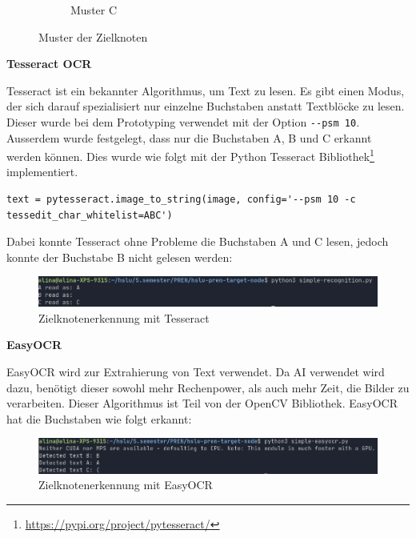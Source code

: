 \begin{figure}[H]
\begin{subfigure}{0.33\textwidth}
\caption{Muster C}
\label{fig:image-c}
\end{subfigure}

\caption{Muster der Zielknoten}
\label{fig:muster-zielknoten}
\end{figure}


\textbf{Tesseract OCR}

Tesseract ist ein bekannter Algorithmus, um Text zu lesen. Es gibt einen Modus, der sich darauf spezialisiert nur einzelne Buchstaben anstatt Textblöcke zu lesen. Dieser wurde bei dem Prototyping verwendet mit der Option \verb|--psm 10|. Ausserdem wurde festgelegt, dass nur die Buchstaben A, B und C erkannt werden können. Dies wurde wie folgt mit der Python Tesseract Bibliothek\footnote{\url{https://pypi.org/project/pytesseract/}} implementiert. 

\begin{verbatim}
text = pytesseract.image_to_string(image, config='--psm 10 -c
tessedit_char_whitelist=ABC')
\end{verbatim}

Dabei konnte Tesseract ohne Probleme die Buchstaben A und C lesen, jedoch konnte der Buchstabe B nicht gelesen werden:

\begin{figure}[H]
\includegraphics[width=0.95\linewidth]{assets/informatik-prototyp/opencv/target_node_detection/tesseract.png} 
\caption{Zielknotenerkennung mit Tesseract}
\label{fig:zielknoten-tesseract}
\end{figure}


\textbf{EasyOCR}

EasyOCR wird zur Extrahierung von Text verwendet. Da AI verwendet wird dazu, benötigt dieser sowohl mehr Rechenpower, als auch mehr Zeit, die Bilder zu verarbeiten. Dieser Algorithmus ist Teil von der OpenCV Bibliothek. EasyOCR hat die Buchstaben wie folgt erkannt:

\begin{figure}[H]
\includegraphics[width=0.95\linewidth]{assets/informatik-prototyp/opencv/target_node_detection/easyocr.png} 
\caption{Zielknotenerkennung mit EasyOCR}
\label{fig:zielknoten-easyocr}
\end{figure}

